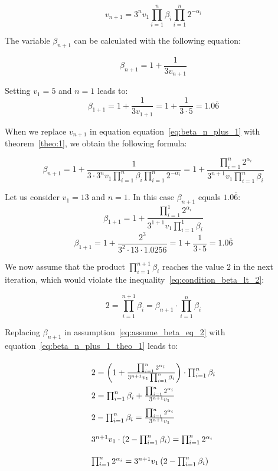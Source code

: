 \begin{equation}
\label{eq:based_theo_1}
v_{n+1}=3^nv_1\prod_{i=1}^{n}\beta_i\prod_{i=1}^{n}2^{-\alpha_i}
\end{equation}

The variable $\beta_{n+1}$ can be calculated with the following equation:

\begin{equation}
\label{eq:beta_n_plus_1}
\beta_{n+1}=1+\frac{1}{3v_{n+1}}
\end{equation}

\begin{example}
	Setting $v_1=5$ and $n=1$ leads to:
	\[
	\beta_{1+1}=1+\frac{1}{3v_{1+1}}=1+\frac{1}{3\cdot5}=1.0\overline{6}
	\]
\end{example}

When we replace $v_{n+1}$ in equation equation~\ref{eq:beta_n_plus_1} with theorem~\ref{theo:1}, we obtain the following formula:

\begin{equation}
\label{eq:beta_n_plus_1_theo_1}
\beta_{n+1}=1+\frac{1}{3\cdot3^nv_1\prod_{i=1}^{n}\beta_i\prod_{i=1}^{n}2^{-\alpha_i}}=1+\frac{\prod_{i=1}^{n}2^{\alpha_i}}{3^{n+1}v_1\prod_{i=1}^{n}\beta_i}
\end{equation}

\begin{example}
Let us consider $v_1=13$ and $n=1$. In this case $\beta_{n+1}$ equals $1.0\overline{6}$:
\[
\beta_{1+1}=1+\frac{\prod_{i=1}^{1}2^{\alpha_i}}{3^{1+1}v_1\prod_{i=1}^{1}\beta_i}
\]
\[
\beta_{1+1}=1+\frac{2^3}{3^2\cdot13\cdot1.0256}=1+\frac{1}{3\cdot5}=1.0\overline{6}
\]
\end{example}

We now assume that the product $\prod_{i=1}^{n+1}\beta_i$ reaches the value $2$ in the next iteration, which would violate the inequality~\ref{eq:condition_beta_lt_2}:

\begin{equation}
\label{eq:assume_beta_eq_2}
2=\prod_{i=1}^{n+1}\beta_i=\beta_{n+1}\cdot\prod_{i=1}^{n}\beta_i
\end{equation}

Replacing $\beta_{n+1}$ in assumption~\ref{eq:assume_beta_eq_2} with equation~\ref{eq:beta_n_plus_1_theo_1} leads to:

\begin{equation}
\label{eq:prod_power_of_two}
\arraycolsep=1.4pt\def\arraystretch{2.2}\begin{array}{l}

2=\left(1+\frac{\prod_{i=1}^{n}2^{\alpha_i}}{3^{n+1}v_1\prod_{i=1}^{n}\beta_i}\right)\cdot\prod_{i=1}^{n}\beta_i\\
2=\prod_{i=1}^{n}\beta_i+\frac{\prod_{i=1}^{n}2^{\alpha_i}}{3^{n+1}v_1}\\
2-\prod_{i=1}^{n}\beta_i=\frac{\prod_{i=1}^{n}2^{\alpha_i}}{3^{n+1}v_1}\\
3^{n+1}v_1\cdot\left(2-\prod_{i=1}^{n}\beta_i\right) =\prod_{i=1}^{n}2^{\alpha_i}\\
\prod_{i=1}^{n}2^{\alpha_i}=3^{n+1}v_1\left(2-\prod_{i=1}^{n}\beta_i\right)
\end{array}
\end{equation}

